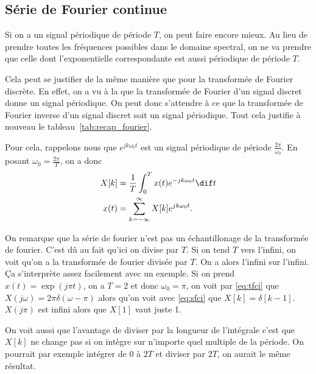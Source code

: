 \subsection{Série de Fourier continue}
\label{sec:sfc}
Si on a un signal périodique de période $T$, on peut faire encore mieux.
Au lieu de prendre toutes les fréquences possibles dans le domaine spectral,
on ne va prendre que celle dont l'exponentielle correspondante est
aussi périodique de période $T$.

Cela peut se justifier de la même manière que pour
la transformée de Fourier discrète.
En effet, on a vu à la 
que la transformée de Fourier d'un signal discret
donne un signal périodique.
On peut donc s'attendre à ce que la transformée de Fourier inverse d'un
signal discret soit un signal périodique.
Tout cela justifie à nouveau le tableau~\ref{tab:recap_fourier}.

Pour cela, rappelons nous que $e^{jk\omega_0t}$ est un signal périodique
de période $\frac{2\pi}{\omega_0}$.
En posant $\omega_0 = \frac{2\pi}{T}$, on a donc
\begin{align}
  \label{eq:sfc}
  X[k] & = \frac{1}{T}\int_0^T x(t) e^{-jk\omega_0t} \dif t\\
  \label{eq:sfci}
  x(t) & = \sum_{k=-\infty}^\infty X[k]e^{jk\omega_0t}.
\end{align}

On remarque que la série de fourier n'est pas un échantillonage de la transformée de fourier.
C'est dû au fait qu'ici on divise par $T$.
Si on tend $T$ vers l'infini, on voit qu'on a la transformée de fourier divisée par $T$.
On a alors l'infini sur l'infini.
Ça s'interprète assez facilement avec un exemple.
Si on prend $x(t) = \exp(j\pi t)$, on a $T = 2$ et donc $\omega_0 = \pi$,
on voit par \eqref{eq:tfci} que $X(j\omega) = 2\pi\delta(\omega - \pi)$ alors qu'on voit
avec \eqref{eq:sfci} que $X[k] = \delta[k - 1]$.
$X(j\pi)$ est infini alors que $X[1]$ vaut juste 1.

On voit aussi que l'avantage de diviser par la longueur de l'intégrale c'est
que $X[k]$ ne change pas si on intègre sur n'importe quel multiple de la période.
On pourrait par exemple intégrer de $0$ à $2T$ et diviser par $2T$, on aurait le même résultat.

